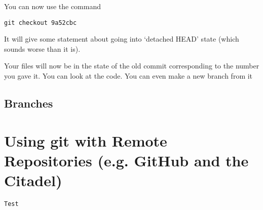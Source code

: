 \documentclass[11pt]{article}
\newcommand{\code}[1]{\quad \texttt{#1}}
\begin{document}
You can now use the command

\code{git checkout 9a52cbc}

It will give some statement about going into `detached HEAD' state (which sounds worse than it is).

Your files will now be in the state of the old commit corresponding to the number you gave it.  You can look at the code.  You can even make a new branch from it
 
\subsection{Branches}

\section{Using git with Remote Repositories (e.g. GitHub and the Citadel)}

\texttt{Test}
\end{document}
